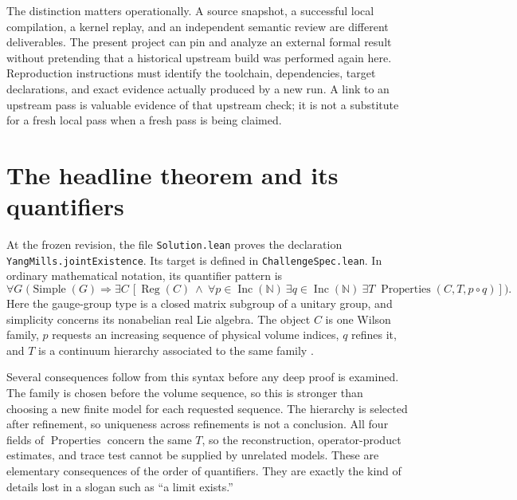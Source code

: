 The distinction matters operationally.  A source snapshot, a successful
local compilation, a kernel replay, and an independent semantic review are
different deliverables.  The present project can pin and analyze an
external formal result without pretending that a historical upstream build
was performed again here.  Reproduction instructions must identify the
toolchain, dependencies, target declarations, and exact evidence actually
produced by a new run.  A link to an upstream pass is valuable evidence of
that upstream check; it is not a substitute for a fresh local pass when a
fresh pass is being claimed.

\section{The headline theorem and its quantifiers}

At the frozen revision, the file \texttt{Solution.lean} proves the
declaration \texttt{YangMills.jointExistence}.  Its target is defined in
\texttt{ChallengeSpec.lean}.  In ordinary mathematical notation, its
quantifier pattern is
\begin{equation}
 \forall G\;\bigl(\operatorname{Simple}(G)\Longrightarrow
 \exists C\,[\operatorname{Reg}(C)\ \wedge\
 \forall p\in\operatorname{Inc}(\mathbb N)
 \ \exists q\in\operatorname{Inc}(\mathbb N)
 \ \exists T\;\operatorname{Properties}(C,T,p\circ q)]\bigr).
 \label{eq:openai-quantifiers}
\end{equation}
Here the gauge-group type is a closed matrix subgroup of a unitary group,
and simplicity concerns its nonabelian real Lie algebra.  The object $C$
is one Wilson family, $p$ requests an increasing sequence of physical
volume indices, $q$ refines it, and $T$ is a continuum hierarchy associated
to the same family \cite{OpenAIChallenge2026,OpenAISolution2026}.

Several consequences follow from this syntax before any deep proof is
examined.  The family is chosen before the volume sequence, so this is
stronger than choosing a new finite model for each requested sequence.
The hierarchy is selected after refinement, so uniqueness across
refinements is not a conclusion.  All four fields of
$\operatorname{Properties}$ concern the same $T$, so the reconstruction,
operator-product estimates, and trace test cannot be supplied by unrelated
models.  These are elementary consequences of the order of quantifiers.
They are exactly the kind of details lost in a slogan such as ``a limit
exists.''


